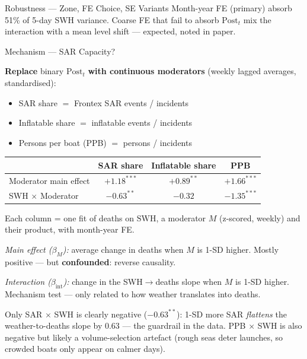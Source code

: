 \documentclass[aspectratio=169,10pt]{beamer}
\begin{document}
\begin{frame}{Robustness --- Zone, FE Choice, SE Variants}
\vspace{0.3em}
\footnotesize
Month-year FE (primary) absorb 51\% of 5-day SWH variance. Coarse FE that fail
to absorb $\text{Post}_t$ mix the interaction with a mean level shift ---
expected, noted in paper.
\end{frame}

\begin{frame}{Mechanism --- SAR Capacity?}

\textbf{Replace} binary $\text{Post}_t$ \textbf{with continuous moderators}
(weekly lagged averages, standardised):
\begin{itemize}
  \item SAR share $=$ Frontex SAR events / incidents
  \item Inflatable share $=$ inflatable events / incidents
  \item Persons per boat (PPB) $=$ persons / incidents
\end{itemize}

\vspace{0.3em}
\begin{table}
\centering
\small
\begin{tabular}{lccc}
\toprule
 & \textbf{SAR share} & \textbf{Inflatable share} & \textbf{PPB} \\
\midrule
Moderator main effect          & $+1.18^{***}$   & $+0.89^{**}$   & $+1.66^{***}$ \\
SWH $\times$ Moderator         & $-0.63^{**}$    & $-0.32$        & $-1.35^{***}$ \\
\bottomrule
\end{tabular}
\end{table}

\vspace{0.3em}
\footnotesize
Each column = one fit of deaths on $\text{SWH}$, a moderator $M$ (z-scored,
weekly) and their product, with month-year FE.

\emph{Main effect ($\beta_M$):} average change in deaths when $M$ is 1-SD
higher. Mostly positive --- but \textbf{confounded}: reverse causality.

\emph{Interaction ($\beta_{\text{int}}$):} change in the SWH$\to$deaths slope when
$M$ is 1-SD higher. Mechanism test --- only related to how weather translates into
deaths.

Only SAR $\times$ SWH is clearly negative ($-0.63^{**}$): 1-SD more SAR
\emph{flattens} the weather-to-deaths slope by 0.63 --- the guardrail in the
data. PPB $\times$ SWH is also negative but likely a volume-selection artefact
(rough seas deter launches, so crowded boats only appear on calmer days).
\end{frame}
\end{document}

